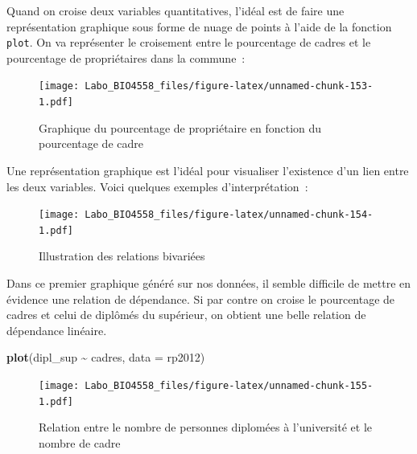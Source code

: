 \documentclass[
  12pt,
]{book}
\newenvironment{Shaded}{\begin{snugshade}}{\end{snugshade}}
\newcommand{\DataTypeTok}[1]{\textcolor[rgb]{0.13,0.29,0.53}{#1}}
\newcommand{\KeywordTok}[1]{\textcolor[rgb]{0.13,0.29,0.53}{\textbf{#1}}}
\newcommand{\NormalTok}[1]{#1}
\newcommand{\OperatorTok}[1]{\textcolor[rgb]{0.81,0.36,0.00}{\textbf{#1}}}
\newcommand{\StringTok}[1]{\textcolor[rgb]{0.31,0.60,0.02}{#1}}
\begin{document}
Quand on croise deux variables quantitatives, l'idéal est de faire une représentation graphique sous forme de nuage de points à l'aide de la fonction \texttt{plot}. On va représenter le croisement entre le pourcentage de cadres et le pourcentage de propriétaires dans la commune~:

\begin{Shaded}
\end{Shaded}

\begin{figure}
\centering
\texttt{[image: Labo\_BIO4558\_files/figure-latex/unnamed-chunk-153-1.pdf]}
\caption{\label{fig:unnamed-chunk-153}Graphique du pourcentage de propriétaire en fonction du pourcentage de cadre}
\end{figure}

Une représentation graphique est l'idéal pour visualiser l'existence d'un lien entre les deux variables. Voici quelques exemples d'interprétation~:

\begin{figure}
\centering
\texttt{[image: Labo\_BIO4558\_files/figure-latex/unnamed-chunk-154-1.pdf]}
\caption{\label{fig:unnamed-chunk-154}Illustration des relations bivariées}
\end{figure}

Dans ce premier graphique généré sur nos données, il semble difficile de mettre en évidence une relation de dépendance. Si par contre on croise le pourcentage de cadres et celui de diplômés du supérieur, on obtient une belle relation de dépendance linéaire.

\begin{Shaded}
\begin{Highlighting}[]
\KeywordTok{plot}\NormalTok{(dipl\_sup }\OperatorTok{\textasciitilde{}}\StringTok{ }\NormalTok{cadres, }\DataTypeTok{data =}\NormalTok{ rp2012)}
\end{Highlighting}
\end{Shaded}

\begin{figure}
\centering
\texttt{[image: Labo\_BIO4558\_files/figure-latex/unnamed-chunk-155-1.pdf]}
\caption{\label{fig:unnamed-chunk-155}Relation entre le nombre de personnes diplomées à l'université et le nombre de cadre}
\end{figure}
\end{document}
